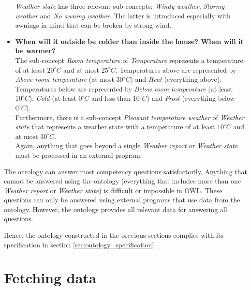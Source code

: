 \begin{itemize}
    \emph{Weather state} has three relevant sub-concepts: \emph{Windy weather}, \emph{Stormy weather} and \emph{No awning weather}. The latter is introduced especially with awnings in mind that can be broken by strong wind.
  \item \textbf{When will it outside be colder than inside the house? When will it be warmer?}\\
    The sub-concept \emph{Room temperature} of \emph{Temperature} represents a temperature of at least $20^\circ C$ and at most $25^\circ C$. Temperatures above are represented by \emph{Above room temperature} (at most $30^\circ C$) and \emph{Heat} (everything above). Temperatures below are represented by \emph{Below room temperature} (at least $10^\circ C$), \emph{Cold} (at least $0^\circ C$ and less than $10^\circ C$) and \emph{Frost} (everything below $0^\circ C$).\\
    Furthermore, there is a sub-concept \emph{Pleasant temperature weather} of \emph{Weather state} that represents a weather state with a temperature of at least $10^\circ C$ and at most $30^\circ C$.\\
    Again, anything that goes beyond a single \emph{Weather report} or \emph{Weather state} must be processed in an external program.
\end{itemize}

The \thinkhomeweather ontology can answer most competency questions satisfactorily. Anything that cannot be answered using the \thinkhomeweather ontology (everything that includes more than one \emph{Weather report} or \emph{Weather state}) is difficult or impossible in OWL. These questions can only be answered using external programs that use data from the \thinkhomeweather ontology. However, the ontology provides all relevant data for answering all questions.

Hence, the ontology constructed in the previous sections complies with its specification in section \ref{sec:ontology_specification}.

\section{Fetching data}


